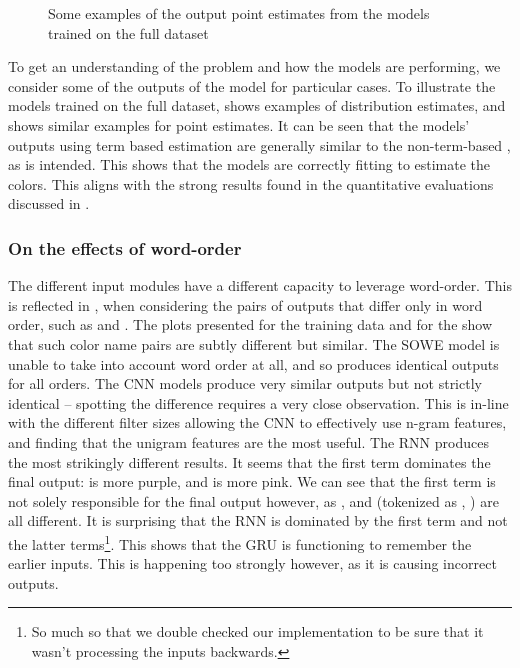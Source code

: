 \documentclass[11pt,a4paper]{article}
\begin{document}
\begin{figure}
	\caption{Some examples of the output point estimates from the models trained on the full dataset} \label{fig:pointout}
\end{figure}


To get an understanding of the problem and how the models are performing, we consider some of the outputs of the model for particular cases.
To illustrate the models trained on the full dataset,  shows examples of distribution estimates, and 
 shows similar examples for point estimates.
It can be seen that the models' outputs using term based estimation are generally similar to the non-term-based \empmodel{}, as is intended.
This shows that the models are correctly fitting to estimate the colors.
This aligns with the strong results found in the quantitative evaluations discussed in .

\subsubsection{On the effects of word-order}
The different input modules have a different capacity to leverage word-order.
This is reflected in ,
when considering the pairs of outputs that differ only in word order, such as  and .
The plots presented for the training data and for the \empmodel{} show that such color name pairs are subtly different but similar.
The SOWE model is unable to take into account word order at all, and so produces identical outputs for all orders.
The CNN models produce very similar outputs but not strictly identical -- spotting the difference requires a very close observation.
This is in-line with the different filter sizes allowing the CNN to effectively use n-gram features, and finding that the unigram features are the most useful.
The RNN produces the most strikingly different results.
It seems that the first term dominates the final output:  is more purple, and   is more pink.
We can see that the first term is not solely responsible for the final output however, as ,  and  (tokenized as , ) are all different.
It is surprising that the RNN is dominated by the first term and not the latter terms\footnote{So much so that we double checked our implementation to be sure that it wasn't processing the inputs backwards.}.
This shows that the GRU is functioning to remember the earlier inputs.
This is happening too strongly however, as it is causing incorrect outputs.
\end{document}
